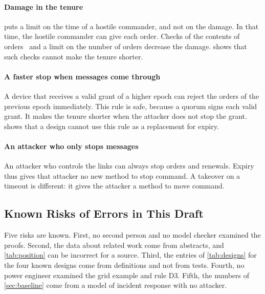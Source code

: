 \paragraph{Damage in the tenure}
\sys{} puts a limit on the time of a hostile commander, and not on the damage. In that
time, the hostile commander can give each order. Checks of the contents of
orders~\cite{mashima2018onthefly,hong2019resilient} and a limit on the number of orders
decrease the damage.  shows that such checks cannot make the tenure
shorter.

\paragraph{A faster stop when messages come through}
A device that receives a valid grant of a higher epoch can reject the orders of the
previous epoch immediately. This rule is safe, because a quorum signs each valid grant. It
makes the tenure shorter when the attacker does not stop the grant.  shows
that a design cannot use this rule as a replacement for expiry.

\paragraph{An attacker who only stops messages}
An attacker who controls the links can always stop orders and renewals. Expiry thus gives
that attacker no new method to stop command. A takeover on a timeout is different: it
gives the attacker a method to move command.

\subsection{Known Risks of Errors in This Draft}

Five risks are known. First, no second person and no model checker examined the proofs.
Second, the data about related work come from abstracts, and \cref{tab:position} can
be incorrect for a source. Third, the entries of \cref{tab:designs} for the four known
designs come from definitions and not from tests. Fourth, no power engineer examined the
grid example and rule D3. Fifth, the numbers of \cref{sec:baseline} come from a model of
incident response with no attacker.
